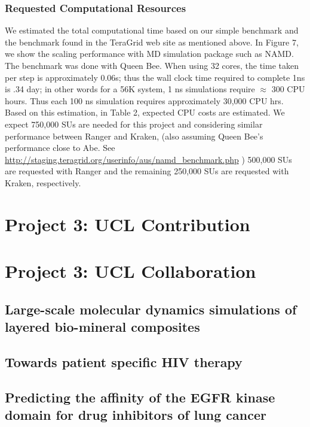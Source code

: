 \documentclass[a4paper,10pt]{article}
\begin{document}
\subsubsection*{Requested Computational Resources}

We estimated the total computational time based on our simple benchmark and the benchmark found in the TeraGrid web site as mentioned above.  In Figure 7, we show the scaling performance with MD simulation package such as NAMD.  The benchmark was done with Queen Bee.  When using 32 cores, the time taken per step is approximately 0.06s; thus the wall clock time required to complete 1ns is .34 day; in other words for a 56K system, 1 ns simulations require $\approx$ 300 CPU hours.  Thus each 100 ns simulation requires approximately 30,000 CPU hrs.  Based on this estimation, in Table 2, expected CPU costs are estimated.  We expect 750,000 SUs are needed for this project and considering similar performance between Ranger and Kraken, (also assuming Queen Bee's performance close to Abe. See {\url{http://staging.teragrid.org/userinfo/aus/namd_benchmark.php}} ) 500,000 SUs are requested with Ranger and the remaining 250,000 SUs are requested with Kraken, respectively.


\section*{Project 3: UCL Contribution}

\section{Project 3: UCL Collaboration}

 \subsection{Large-scale molecular dynamics simulations of layered bio-mineral composites}
 

\subsection{Towards patient specific HIV therapy}


\subsection{Predicting the affinity of the EGFR kinase domain for drug inhibitors of lung cancer}

\end{document}
